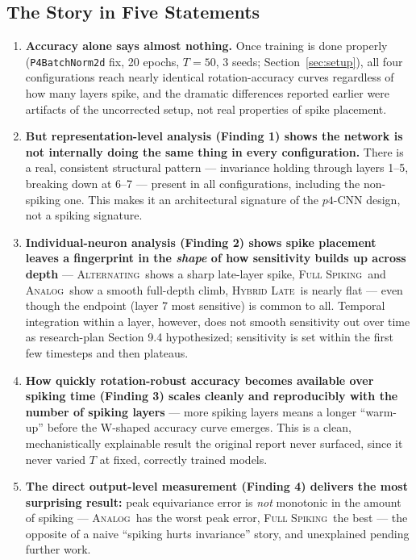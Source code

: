 \documentclass[11pt]{article}
\newcommand{\Analog}{\textsc{Analog}}
\newcommand{\Alternating}{\textsc{Alternating}}
\newcommand{\FullSpiking}{\textsc{Full Spiking}}
\newcommand{\HybridLate}{\textsc{Hybrid Late}}
\begin{document}
\subsection{The Story in Five Statements}

\begin{enumerate}[leftmargin=1.8em]
\item \textbf{Accuracy alone says almost nothing.} Once training is done properly
(\texttt{P4BatchNorm2d} fix, 20 epochs, $T = 50$, 3 seeds; Section~\ref{sec:setup}), all four
configurations reach nearly identical rotation-accuracy curves regardless of how many layers spike,
and the dramatic differences reported earlier were artifacts of the uncorrected setup, not real
properties of spike placement.
\item \textbf{But representation-level analysis (Finding 1) shows the network is not internally
doing the same thing in every configuration.} There is a real, consistent structural pattern ---
invariance holding through layers 1--5, breaking down at 6--7 --- present in all configurations,
including the non-spiking one. This makes it an architectural signature of the $p4$-CNN design, not
a spiking signature.
\item \textbf{Individual-neuron analysis (Finding 2) shows spike placement leaves a fingerprint in
the \emph{shape} of how sensitivity builds up across depth} --- \Alternating\ shows a sharp late-layer
spike, \FullSpiking\ and \Analog\ show a smooth full-depth climb, \HybridLate\ is nearly flat --- even
though the endpoint (layer 7 most sensitive) is common to all. Temporal integration within a layer,
however, does not smooth sensitivity out over time as research-plan Section 9.4 hypothesized;
sensitivity is set within the first few timesteps and then plateaus.
\item \textbf{How quickly rotation-robust accuracy becomes available over spiking time (Finding 3)
scales cleanly and reproducibly with the number of spiking layers} --- more spiking layers means a
longer ``warm-up'' before the W-shaped accuracy curve emerges. This is a clean, mechanistically
explainable result the original report never surfaced, since it never varied $T$ at fixed, correctly
trained models.
\item \textbf{The direct output-level measurement (Finding 4) delivers the most surprising result:}
peak equivariance error is \emph{not} monotonic in the amount of spiking --- \Analog\ has the worst
peak error, \FullSpiking\ the best --- the opposite of a naive ``spiking hurts invariance'' story,
and unexplained pending further work.
\end{enumerate}
\end{document}
